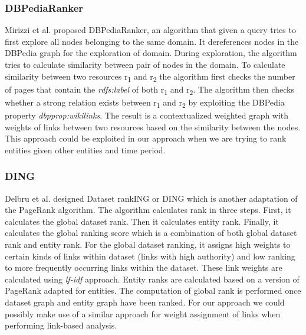 \documentclass{article}
\begin{document}
    \subsubsection{DBPediaRanker}
    Mirizzi et al.\cite{mirizzi10} proposed DBPediaRanker, an algorithm that given a query tries to first explore all nodes belonging to the same domain. It dereferences nodes in the DBPedia graph for the exploration of domain. During exploration, the algorithm tries to calculate similarity between pair of nodes in the domain. To calculate similarity between two resources r\textsubscript{1} and r\textsubscript{2} the algorithm first checks the number of pages that contain the \emph{rdfs:label} of both r\textsubscript{1} and r\textsubscript{2}. The algorithm then checks whether a strong relation exists between r\textsubscript{1} and r\textsubscript{2} by exploiting the DBPedia property \emph{dbpprop:wikilinks}. The result is a contextualized weighted graph with weights of links between two resources based on the similarity between the nodes. This approach could be exploited in our approach when we are trying to rank entities given other entities and time period.

    \subsubsection{DING}
    Delbru et al.\cite{delbru10} designed Dataset rankING or DING which is another adaptation of the PageRank algorithm. The algorithm calculates rank in three steps. First, it calculates the global dataset rank. Then it calculates entity rank. Finally, it calculates the global ranking score which is a combination of both global dataset rank and entity rank. For the global dataset ranking, it assigns high weights to certain kinds of links within dataset (links with high authority) and low ranking to more frequently occurring links within the dataset. These link weights are calculated using \emph{lf-idf} approach. Entity ranks are calculated based on a version of PageRank adapted for entities. The computation of global rank is performed once dataset graph and entity graph have been ranked. For our approach we could possibly make use of a similar approach for weight assignment of links when performing link-based analysis.
\end{document}
